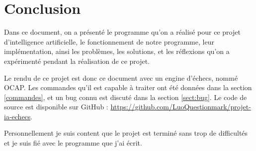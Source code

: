 \documentclass{article}
\begin{document}
\section{Conclusion}
\par Dans ce document, on a présenté le programme qu'on a réalisé pour ce projet d'intelligence artificielle, le fonctionnement de notre programme, leur implémentation, ainsi les problèmes, les solutions, et les réflexions qu'on a expérimenté pendant la réalisation de ce projet.

\par Le rendu de ce projet est donc ce document avec un engine d'échecs, nommé OCAP. Les commandes qu'il est capable à traiter ont été données dans la section \ref{commandes}, et un bug connu est discuté dans la section \ref{sect:bug}. Le code de source est disponible sur GitHub : \url{https://github.com/LuoQuestionmark/projet-ia-echecs}.

\par Personnellement je suis content que le projet est terminé sans trop de difficultés et je suis fié avec le programme que j'ai écrit.

\clearpage


\end{document}
